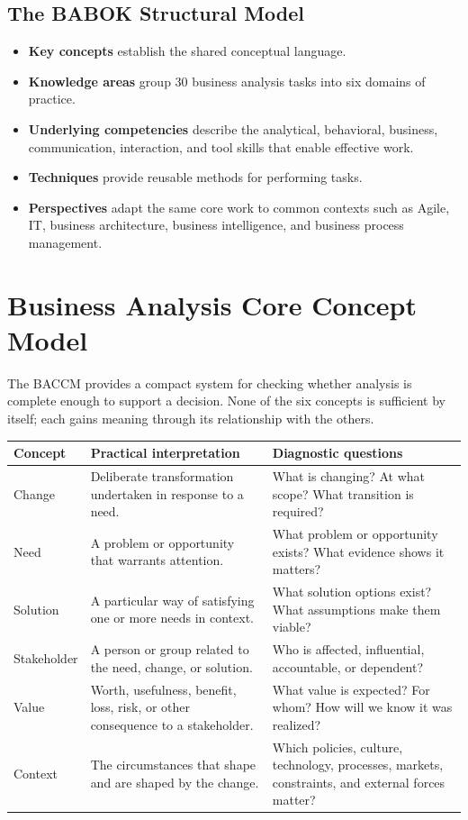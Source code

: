 \documentclass[11pt]{article}
\begin{document}
\subsection{The BABOK Structural Model}
\begin{itemize}
\item \textbf{Key concepts} establish the shared conceptual language.
\item \textbf{Knowledge areas} group 30 business analysis tasks into six domains of practice.
\item \textbf{Underlying competencies} describe the analytical, behavioral, business, communication, interaction, and tool skills that enable effective work.
\item \textbf{Techniques} provide reusable methods for performing tasks.
\item \textbf{Perspectives} adapt the same core work to common contexts such as Agile, IT, business architecture, business intelligence, and business process management.
\end{itemize}
\section{Business Analysis Core Concept Model}
The BACCM provides a compact system for checking whether analysis is complete enough to support a decision. None of the six concepts is sufficient by itself; each gains meaning through its relationship with the others.

\begin{longtable}{L{0.13\textwidth} L{0.37\textwidth} L{0.40\textwidth}}
\toprule
\textbf{Concept} & \textbf{Practical interpretation} & \textbf{Diagnostic questions}\\
\midrule
\endhead
Change & Deliberate transformation undertaken in response to a need. & What is changing? At what scope? What transition is required?\\
Need & A problem or opportunity that warrants attention. & What problem or opportunity exists? What evidence shows it matters?\\
Solution & A particular way of satisfying one or more needs in context. & What solution options exist? What assumptions make them viable?\\
Stakeholder & A person or group related to the need, change, or solution. & Who is affected, influential, accountable, or dependent?\\
Value & Worth, usefulness, benefit, loss, risk, or other consequence to a stakeholder. & What value is expected? For whom? How will we know it was realized?\\
Context & The circumstances that shape and are shaped by the change. & Which policies, culture, technology, processes, markets, constraints, and external forces matter?\\
\bottomrule
\end{longtable}
\end{document}
